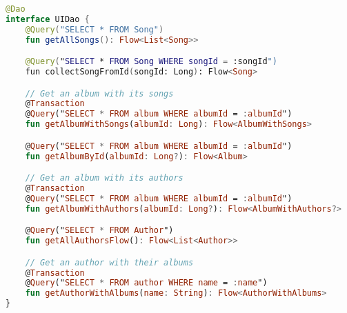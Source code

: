 \begin{lstlisting}[caption=Deklaracja interfejsu \texttt{UIdao}, label={lst:UIDao_int}, language=kotlin]
@Dao
interface UIDao {
    @Query("SELECT * FROM Song")
    fun getAllSongs(): Flow<List<Song>>

    @Query("SELECT * FROM Song WHERE songId = :songId")
    fun collectSongFromId(songId: Long): Flow<Song>

    // Get an album with its songs
    @Transaction
    @Query("SELECT * FROM album WHERE albumId = :albumId")
    fun getAlbumWithSongs(albumId: Long): Flow<AlbumWithSongs>

    @Query("SELECT * FROM album WHERE albumId = :albumId")
    fun getAlbumById(albumId: Long?): Flow<Album>

    // Get an album with its authors
    @Transaction
    @Query("SELECT * FROM album WHERE albumId = :albumId")
    fun getAlbumWithAuthors(albumId: Long?): Flow<AlbumWithAuthors?>

    @Query("SELECT * FROM Author")
    fun getAllAuthorsFlow(): Flow<List<Author>>

    // Get an author with their albums
    @Transaction
    @Query("SELECT * FROM author WHERE name = :name")
    fun getAuthorWithAlbums(name: String): Flow<AuthorWithAlbums>
}
\end{lstlisting}

